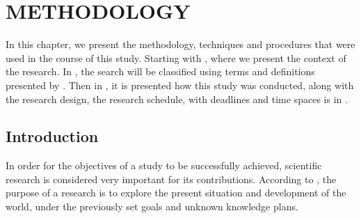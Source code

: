 \chapter{METHODOLOGY}\label{methodology}


In this chapter, we present the methodology, techniques and procedures that were used in the course of this study. 
Starting with , where we present the context of the research. 
In , the search will be classified using terms and definitions presented by \textcite{Prodanov:2013}. 
Then in , it is presented how this study was conducted, along with the research design, the research schedule, with deadlines and time spaces is in .

\section{Introduction}\label{sec:met-intro}


In order for the objectives of a study to be successfully achieved, scientific research is considered very important for its contributions. 
According to \cite{pingping_yulan_2013}, the purpose of a research is to explore the present situation and development of the world, under the previously set goals and unknown knowledge plans.

